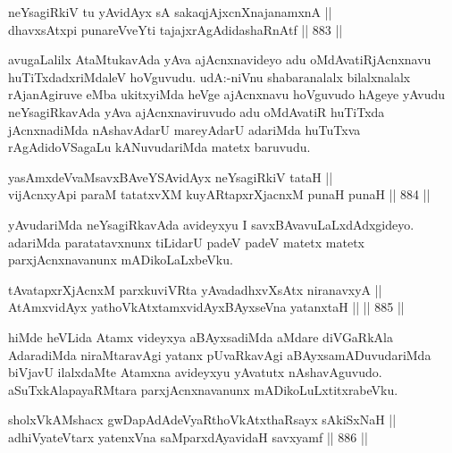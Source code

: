 \begin{shl}
neYsagiRkiV tu yA\s vidAyx sA sakaqjAjxcnXnajanamxnA || \\
dhavxsAtx\s pi punareVveYti tajajxrAgAdidashaRnAtf \hfill || 883 ||  
\end{shl}

\begin{artha}
avugaLalilx AtaMtukavAda yAva ajAcnxnavideyo adu oMdAvatiRjAcnxnavu huTiTxdadxriMdaleV hoVguvudu. udA:-niVnu shabaranalalx bilalxnalalx rAjanAgiruve eMba ukitxyiMda heVge ajAcnxnavu hoVguvudo hAgeye yAvudu neYsagiRkavAda yAva ajAcnxnaviruvudo adu oMdAvatiR huTiTxda jAcnxnadiMda nAshavAdarU mareyAdarU adariMda huTuTxva rAgAdidoVSagaLu kANuvudariMda matetx baruvudu.
\end{artha}


\begin{shl}
yasAmxdeVvaMsavxBAveYSA\s vidAyx neYsagiRkiV tataH || \\
vijAcnxyApi paraM tatatxvXM kuyARtapxrXjacnxM punaH punaH \hfill || 884 ||  
\end{shl}

\begin{artha}
yAvudariMda neYsagiRkavAda avideyxyu I savxBAvavuLaLxdAdxgideyo. adariMda paratatavxnunx tiLidarU padeV padeV matetx matetx parxjAcnxnavanunx mADikoLaLxbeVku.
\end{artha}


\begin{shl}
tAvatapxrXjAcnxM parxkuviVRta yAvadadhxvXsAtx niranavxyA || \\
AtAmxvidAyx yathoVkAtxtamxvidAyxBAyxseVna yatanxtaH ||  \hfill || 885 ||  
\end{shl}

\begin{artha}
hiMde heVLida Atamx videyxya aBAyxsadiMda aMdare diVGaRkAla AdaradiMda niraMtaravAgi yatanx pUvaRkavAgi aBAyxsamADuvudariMda biVjavU ilalxdaMte Atamxna avideyxyu yAvatutx nAshavAguvudo. aSuTxkAlapayaRMtara parxjAcnxnavanunx mADikoLuLxtitxrabeVku.
\end{artha}

\begin{shl}
sholxVkAMshacx gwDapAdAdeVyaRthoVkAtxthaRsayx sAkiSxNaH || \\
adhiVyateV\s tarx yatenxVna saMparxdAyavidaH savxyamf \hfill || 886 ||  
\end{shl}

